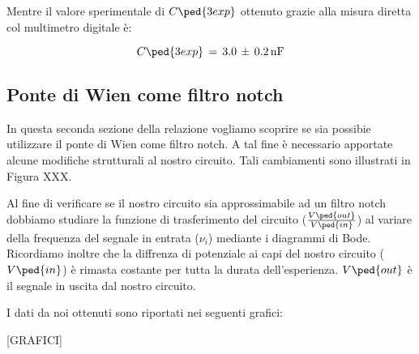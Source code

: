 Mentre il valore sperimentale di $C\ped{3exp}$ ottenuto grazie alla misura diretta col multimetro digitale è:

\begin{equation}
	C\ped{3exp} \,=\, 3.0 \,\pm\, 0.2 \,\si{\nano\farad}
	\label{eq:C_exp} 
\end{equation}

\subsection*{Ponte di Wien come filtro notch}

In questa seconda sezione della relazione vogliamo scoprire se sia possibie utilizzare il ponte di Wien come filtro notch. A tal fine è necessario apportate alcune modifiche strutturali al nostro circuito. Tali cambiamenti sono illustrati in Figura XXX.

Al fine di verificare se il nostro circuito sia approssimabile ad un filtro notch dobbiamo studiare la funzione di trasferimento del circuito ($\frac{V\ped{out}}{V\ped{in}}$) al variare della frequenza del segnale in entrata ($\nu_i$) mediante i diagrammi di Bode. Ricordiamo inoltre che la diffrenza di potenziale ai capi del nostro circuito ($V\ped{in}$) è rimasta costante per tutta la durata dell'esperienza. $V\ped{out}$ è il segnale in uscita dal nostro circuito.

I dati da noi ottenuti sono riportati nei seguenti grafici:

[GRAFICI]
